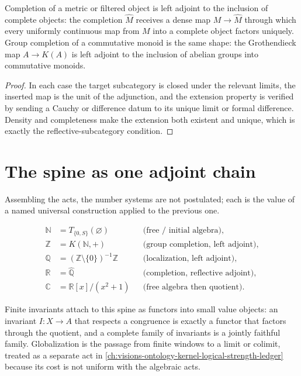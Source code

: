 \begin{theorem}
\label{thm:ontology-kernel-completion-reflective}
Completion of a metric or filtered object is left adjoint to the inclusion of
complete objects: the completion $\widehat M$ receives a dense map $M\to
\widehat M$ through which every uniformly continuous map from $M$ into a
complete object factors uniquely.  Group completion of a commutative monoid is
the same shape: the Grothendieck map $A\to K(A)$ is left adjoint to the
inclusion of abelian groups into commutative monoids.
\end{theorem}

\begin{proof}
In each case the target subcategory is closed under the relevant limits, the
inserted map is the unit of the adjunction, and the extension property is
verified by sending a Cauchy or difference datum to its unique limit or formal
difference.  Density and completeness make the extension both existent and
unique, which is exactly the reflective-subcategory condition.
\end{proof}

\section{The spine as one adjoint chain}
\label{sec:ontology-kernel-spine-adjoint-chain}

Assembling the acts, the number systems are not postulated; each is the value
of a named universal construction applied to the previous one.

$$
\begin{aligned}
\mathbb N &= T_{\{0,S\}}(\varnothing)
   && \text{(free / initial algebra)},\\
\mathbb Z &= K(\mathbb N,+)
   && \text{(group completion, left adjoint)},\\
\mathbb Q &= (\mathbb Z\setminus\{0\})^{-1}\mathbb Z
   && \text{(localization, left adjoint)},\\
\mathbb R &= \widehat{\mathbb Q}
   && \text{(completion, reflective adjoint)},\\
\mathbb C &= \mathbb R[x]/(x^2+1)
   && \text{(free algebra then quotient)}.
\end{aligned}
$$

Finite invariants attach to this spine as functors into small value objects:
an invariant $I:X\to A$ that respects a congruence is exactly a functor that
factors through the quotient, and a complete family of invariants is a jointly
faithful family.  Globalization is the passage from finite windows to a limit or
colimit, treated as a separate act in
\autoref{ch:visions-ontology-kernel-logical-strength-ledger} because its cost is
not uniform with the algebraic acts.

